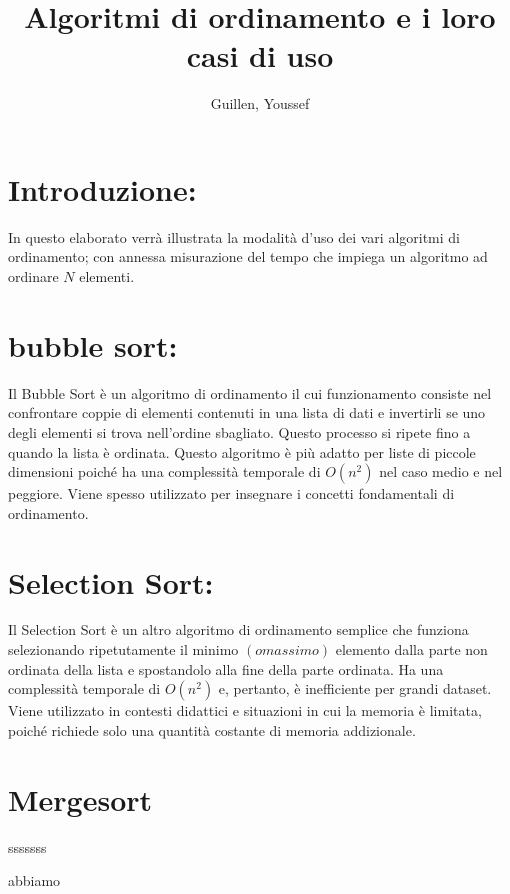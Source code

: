 \documentclass{article}
\author{Guillen, Youssef}
\title{Algoritmi di ordinamento e i loro casi di uso}
\begin{document}
\maketitle
\section*{Introduzione:}
In questo elaborato verrà illustrata la modalità d’uso dei vari algoritmi di ordinamento; con annessa misurazione del tempo che impiega un 
algoritmo ad ordinare \(N\) elementi.
\section*{bubble sort:}
Il Bubble Sort è un algoritmo di ordinamento il cui funzionamento consiste nel confrontare coppie di elementi contenuti in una lista di dati
e invertirli se uno degli elementi si trova nell'ordine sbagliato. Questo processo si ripete 
fino a quando la lista è ordinata. Questo algoritmo è più adatto per liste di piccole dimensioni poiché ha una complessità 
temporale di \(O(n^2)\) nel caso medio e nel peggiore. Viene spesso utilizzato per insegnare i concetti fondamentali di ordinamento.
\begin{figure}[ht!]
    \centering
\end{figure}

\section*{Selection Sort:}
Il Selection Sort è un altro algoritmo di ordinamento semplice che funziona selezionando ripetutamente il minimo \((o massimo)\) elemento 
dalla parte non ordinata della lista e spostandolo alla fine della parte ordinata. Ha una complessità temporale di \(O(n^2)\) e, pertanto, 
è inefficiente per grandi dataset. Viene utilizzato in contesti didattici e situazioni in cui la memoria è limitata, poiché richiede solo 
una quantità costante di memoria addizionale.
\begin{figure}[ht!]
    \centering
\end{figure}
\section*{Mergesort}
sssssss
\begin{figure}[ht!]
    \centering
\end{figure}

abbiamo
\end{document}
